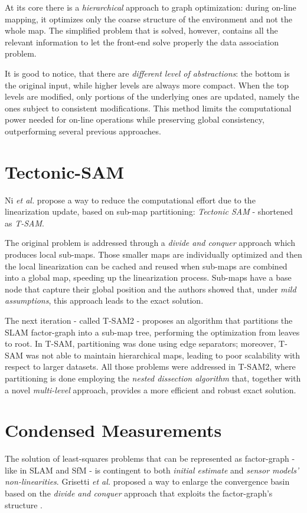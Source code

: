 At its core there is a \textit{hierarchical} approach to graph optimization: during on-line mapping, it optimizes only the coarse structure of the environment and not the whole map. The simplified problem that is solved, however, contains all the relevant information to let the front-end solve properly the data association problem. 

It is good to notice, that there are \textit{different level of abstractions}: the bottom is the original input, while higher levels are always more compact. When the top levels are modified, only portions of the underlying ones are updated, namely the ones subject to consistent modifications. This method limits the computational power needed for on-line operations while preserving global consistency, outperforming several previous approaches.

\section{Tectonic-SAM}\label{sec:tsam}
Ni \textit{et al.} propose a way to reduce the computational effort due to the linearization update, based on sub-map partitioning: \textit{Tectonic SAM} \cite{ni2007tectonic} - shortened as \textit{T-SAM}.

The original problem is addressed through a \textit{divide and conquer} approach which produces local sub-maps. Those smaller maps are individually optimized and then the local linearization can be cached and reused when sub-maps are combined into a global map, speeding up the linearization process. Sub-maps have a base node that capture their global position and the authors showed that, under \textit{mild assumptions}, this approach leads to the exact solution. 

The next iteration - called T-SAM2 \cite{ni2010nestedDiss} - proposes an algorithm that partitions the SLAM factor-graph into a sub-map tree, performing the optimization from leaves to root. In T-SAM, partitioning was done using edge separators; moreover, T-SAM was not able to maintain hierarchical maps, leading to poor scalability with respect to larger datasets. All those problems were addressed in T-SAM2, where partitioning is done employing the \textit{nested dissection algorithm} that, together with a novel \textit{multi-level} approach, provides a more efficient and robust exact solution.

\section{Condensed Measurements}\label{sec:cmeas}
The solution of least-squares problems that can be represented as factor-graph - like in SLAM and SfM - is contingent to both \textit{initial estimate} and \textit{sensor models' non-linearities}. Grisetti \textit{et al.} proposed a way to enlarge the convergence basin based on the \textit{divide and conquer} approach that exploits the factor-graph's structure \cite{grisetti2012condensed}. 

